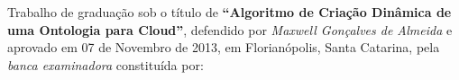 \documentclass[12pt,openright,twoside,a4paper,english,brazil]{abntex2}
\begin{document}

%
% 
%
\begin{folhadeaprovacao}

  \begin{center}
    {\ABNTEXchapterfont\large\imprimirautor}

    \vspace*{\fill}\vspace*{\fill}
    {\ABNTEXchapterfont\bfseries\Large\imprimirtitulo}
    \vspace*{\fill}
    
    \hspace{.45\textwidth}
    \vspace*{\fill}
 \end{center}
    
   Trabalho de graduação sob o título de \textbf{``Algoritmo de Criação Dinâmica
   de uma Ontologia para Cloud''}, defendido por \textit{Maxwell Gonçalves de
   Almeida} e aprovado em \textrm{07 de Novembro de 2013}, em
   \textrm{Florianópolis, Santa Catarina}, pela \textit{banca examinadora}
   constituída por:

      
   \begin{center}
    \vspace*{0.5cm}
    {\large\imprimirlocal}
    \par
    {\large\imprimirdata}
    \vspace*{1cm}
  \end{center}
  
\end{folhadeaprovacao}
\end{document}
